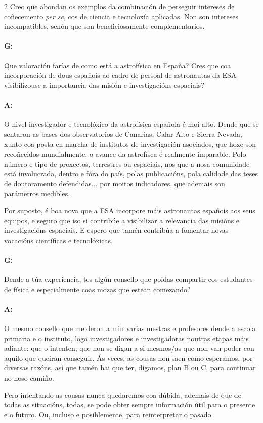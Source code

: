 \begin{refsection}
\begin{multicols}{2}
Creo que abondan os exemplos da combinación de perseguir intereses de
coñecemento \textit{per se}, cos de ciencia e tecnoloxía aplicadas. Non son
intereses incompatibles, senón que son beneficiosamente complementarios.

\paragraph{G:} Que valoración farías de como está a astrofísica en España? Cres
que coa incorporación de dous españois ao cadro de persoal de astronautas da
ESA visibilizouse a importancia das misión e investigacións espaciais?

\paragraph{A:} O nivel investigador e tecnolóxico da astrofísica española é moi
alto. Dende que se sentaron as bases dos observatorios de Canarias, Calar Alto
e Sierra Nevada, xunto coa posta en marcha de institutos de investigación
asociados, que hoxe son recoñecidos mundialmente, o avance da astrofísca é
realmente imparable. Polo número e tipo de proxectos, terrestres ou espaciais,
nos que a nosa comunidade está involucrada, dentro e fóra do país, polas
publicacións, pola calidade das teses de doutoramento defendidas... por moitos
indicadores, que ademais son parámetros medibles.

Por suposto, é boa nova que a ESA incorpore máis astronautas españois aos seus
equipos, e seguro que iso si contribúe a visibilizar a relevancia das misións e
investigacións espaciais. E espero que tamén contribúa a fomentar novas
vocacións científicas e tecnolóxicas.

\paragraph{G:} Dende a túa experiencia, tes algún consello que poidas compartir
cos estudantes de física e especialmente coas mozas que estean comezando?

\paragraph{A:} O mesmo consello que me deron a min varias mestras e profesores
dende a escola primaria e o instituto, logo investigadores e investigadoras
noutras etapas máis adiante: que o intenten, que non se digan a si mesmos/as
que non van poder con aquilo que queiran conseguir. Ás veces, as cousas non
saen como esperamos, por diversas razóns, así que tamén hai que ter, digamos,
plan B ou C, para continuar no noso camiño.

Pero intentando as cousas nunca quedaremos coa dúbida, ademais de que de todas
as situacións, todas, se pode obter sempre información útil para o presente e o
futuro. Ou, incluso e posiblemente, para reinterpretar o pasado.

\end{multicols}
\end{refsection}
